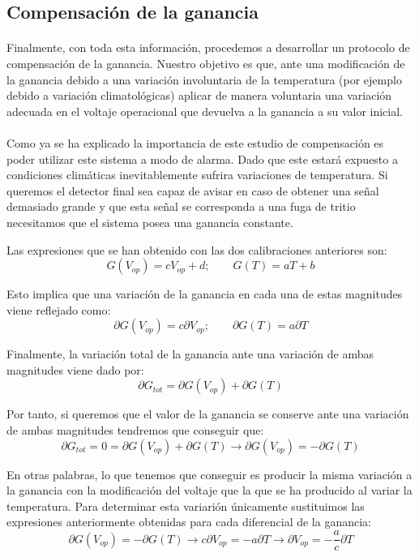 \documentclass[11pt, a4paper]{article}
\begin{document}
\subsection {Compensación de la ganancia}
\paragraph {}
Finalmente, con toda esta información, procedemos a desarrollar un protocolo de compensación de la ganancia. Nuestro objetivo es que, ante una modificación de la ganancia debido a una variación involuntaria de la temperatura (por ejemplo debido a variación climatológicas) aplicar de manera voluntaria una variación adecuada en el voltaje operacional que devuelva a la ganancia a su valor inicial.

\paragraph {}
Como ya se ha explicado la importancia de este estudio de compensación es poder utilizar este sistema a modo de alarma. Dado que este estará expuesto a condiciones climáticas inevitablemente sufrira variaciones de temperatura. Si queremos el detector final sea capaz de avisar en caso de obtener una señal demasiado grande y que esta señal se corresponda a una fuga de tritio necesitamos que el sistema posea una ganancia constante.

Las expresiones que se han obtenido con las dos calibraciones anteriores son:
$$G(V_{op})=cV_{op}+d; \qquad G(T)=aT+b$$

Esto implica que una variación de la ganancia en cada una de estas magnitudes viene reflejado como:
$$\partial G(V_{op}) = c \partial V_{op}; \qquad \partial G(T) = a \partial T$$

Finalmente, la variación total de la ganancia ante una variación de ambas magnitudes viene dado por:
$$\partial G_{tot} = \partial G(V_{op}) + \partial G(T)$$

Por tanto, si queremos que el valor de la ganancia se conserve ante una variación de ambas magnitudes tendremos que conseguir que: 
$$\partial G_{tot} = 0 =  \partial G(V_{op}) + \partial G(T) \longrightarrow \partial G(V_{op}) = -\partial G(T)  $$

En otras palabras, lo que tenemos que conseguir es producir la misma variación a la ganancia con la modificación del voltaje que la que se ha producido al variar la temperatura. Para determinar esta variarión únicamente sustituimos las expresiones anteriormente obtenidas para cada diferencial de la ganancia:
$$\partial G(V_{op}) = - \partial G(T)  \longrightarrow c \partial V_{op}= - a \partial T \longrightarrow  \partial V_{op}= - \frac{a}{c} \partial T$$
\end{document}
